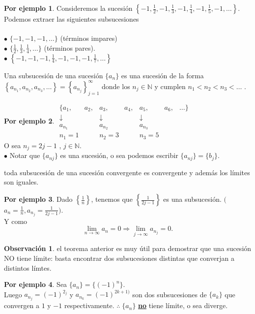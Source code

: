 \documentclass{article}
\theoremstyle{definition}
\newtheorem*{obs}{Observación}
\newtheorem*{ej}{Por ejemplo}
\theoremstyle{remark}
\begin{document}
\begin{ej}
  Consideremos la sucesión $\left\{-1,\frac{1}{2},-1,\frac{1}{3},-1,\frac{1}{4},-1,\frac{1}{5},-1,\dots\right\}$. Podemos extraer las siguientes subsucesiones \\ \\
  $\bullet$ $\{-1,-1,-1,\dots\}$  \quad (términos impares) \\
  $\bullet$ $\{\frac{1}{2},\frac{1}{3},\frac{1}{4},\dots\}$  \quad \quad \; \;(términos pares). \\
  $\bullet$ $\left\{-1,-1,-1,\frac{1}{4},-1,-1,-1,\frac{1}{7},\dots\right\}$

\end{ej}
\begin{defi}
  Una subsucesión de una sucesión $\{a_n\}$ es una sucesión de la forma $\left\{a_{n_1},a_{n_2},a_{n_3},\dots \right\} =\left\{a_{n_j}\right\}_{j=1}^{\infty}$ donde los $n_j \in \mathbb{N}$ y cumplen $n_1 < n_2 < n_3 < \dots$ . 
\end{defi}
\begin{ej}

$\begin{matrix*}
  \{a_1, & a_2, & a_3, & a_4, & a_5, & a_6, & \dots \} \\ 
  \downarrow & & \downarrow & & \downarrow & & \\
  a_{n_1} & & a_{n_2} & & a_{n_3} & & \\
  n_1=1 & & n_2=3 & & n_3=5
\end{matrix*}$ \\

O sea $n_j=2j-1 $ , $j \in \mathbb{N}$. \\

$\bullet$ \; Notar que $\{a_{nj}\}$ es una sucesión, o sea podemos escribir $\{a_{nj}\}=\{b_j\}$.

\end{ej} 
\begin{teo}
  toda subsucesión de una sucesión convergente es convergente y además los límites son iguales.
\end{teo}
\begin{ej}
  Dado $\left\{\frac{1}{n}\right\}$, tenemos que $\left\{\frac{1}{2j-1}\right\}$ es una subsucesión. $\big($  \\  $a_n=\frac{1}{n}, a_{n_j}=\frac{1}{2j-1}\big).$ \\ 
  Y como \[\lim_{n \to \infty}{a_n}=0 \Rightarrow \lim_{j \to \infty}{a_{n_j}}=0. \]
\end{ej}
\begin{obs}
  el teorema anterior es muy útil para demostrar que una sucesión NO tiene límite: basta encontrar dos subsucesiones distintas que converjan a distintos límtes.
\end{obs}
\begin{ej}
  Sea $\{a_n\}=\{(-1)^n\}$. \\
  Luego $a_{n_j}=(-1)^{2_j}$ y $a_{n_k}=(-1)^{2k+1)}$ son dos subsucesiones de $\{a_k\}$ que convergen a $1$ y $-1$ respectivamente. $\therefore \; \{a_n\}$ \textbf{\underline{no}} tiene límite, o sea diverge.
\end{ej}
\end{document}
